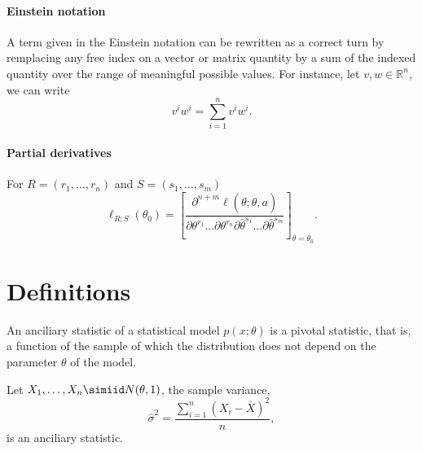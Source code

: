 \paragraph{Einstein notation} A term given in the Einstein notation can be rewritten as a correct turn by remplacing any free index on a vector or matrix quantity by a sum of the indexed quantity over the range of meaningful possible values. For instance, let $v, w \in \mathbb{R}^n$, we can write
\begin{equation*}
    v^iw^i = \sum_{i=1}^n v^iw^i. 
\end{equation*}


\paragraph{Partial derivatives} For $R = (r_1, \ldots, r_n)$ and $S = (s_1, \ldots, s_m)$
\begin{equation*}
    \ell_{R;S}(\theta_0) = \left[\frac{\partial^{n+m}\ell(\theta; \hat\theta, a)}{\partial\theta^{r_1} \ldots \partial\theta^{r_n}\partial\hat\theta^{s_1} \ldots \partial\hat\theta^{s_m}}\right]_{\theta=\theta_0}.
\end{equation*}


\section{Definitions}

\begin{definition}
    An anciliary statistic of a statistical model $p(x; \theta)$ is a pivotal statistic, that is, a function of the sample of which the distribution does not depend on the parameter $\theta$ of the model.
\end{definition}

\begin{example} \label{ex-normal}
    Let $X_1, \ldots, X_n \simiid N(\theta, 1)$, the sample variance,
    \begin{equation*}
        \hat\sigma^2 = \frac{\sum_{i=1}^n (X_i - \bar X)^2}{n},
    \end{equation*}
    is an anciliary statistic.
\end{example}


